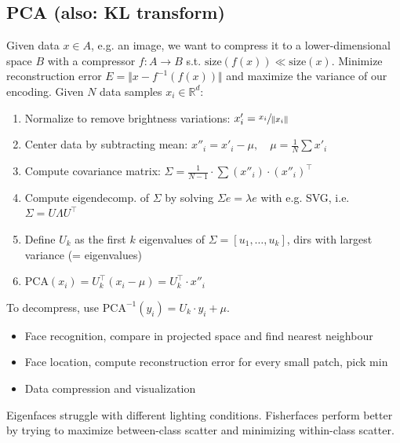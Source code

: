 \documentclass[a4paper,10pt]{article}
\begin{document}

\subsection{PCA (also: KL transform)}
Given data \( x \in A \), e.g. an image, we want to compress it to a lower-dimensional space \( B \) with a compressor \( f: A \to B \) s.t. \( \text{size}(f(x)) \ll \text{size}(x) \). Minimize reconstruction error \( E = \Vert x - f^{-1}(f(x)) \Vert \) and maximize the variance of our encoding. Given \( N \) data samples \( x_i \in \mathbb{R}^d \):
\begin{enumerate}
    \item Normalize to remove brightness variations: \( x'_i = \sfrac{x_i}{\Vert x_i\Vert} \)
    \item Center data by subtracting mean: \( x''_i = x'_i - \mu, \quad \mu = \frac{1}{N}\sum x'_i  \)
    \item Compute covariance matrix: \( \Sigma = \frac{1}{N-1}\cdot \sum (x''_i)\cdot (x''_i)^\top \)
    \item Compute eigendecomp. of \( \Sigma \) by solving \( \Sigma e = \lambda e \) with e.g. SVG, i.e. \( \Sigma = U \Lambda U^\top \)
    \item Define \( U_k \) as the first \( k \) eigenvalues of \( \Sigma = \left[u_{1}, \ldots, u_k\right] \), dirs with largest variance (= eigenvalues)
    \item \( \text{PCA}(x_i) = U^\top_k (x_i - \mu) = U^\top_k \cdot x''_i \)
\end{enumerate}
To decompress, use \( \text{PCA}^{-1}(y_i) = U_k\cdot y_i + \mu  \).
\begin{itemize}
    \item Face recognition, compare in projected space and find nearest neighbour
    \item Face location, compute reconstruction error for every small patch, pick min
    \item Data compression and visualization
\end{itemize}
Eigenfaces struggle with different lighting conditions. Fisherfaces perform better by trying to maximize between-class scatter and minimizing within-class scatter.
\end{document}
